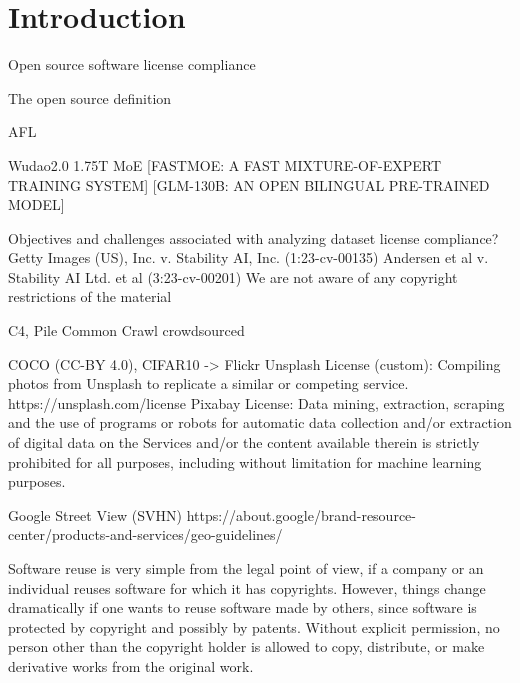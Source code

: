 \section{Introduction}
Open source software license compliance~\cite{ombredanne2020free}

The open source definition~\cite{perens1999open}

AFL~\cite{rosen2005open}

Wudao2.0 1.75T MoE
[FASTMOE: A FAST MIXTURE-OF-EXPERT TRAINING SYSTEM]
[GLM-130B: AN OPEN BILINGUAL PRE-TRAINED MODEL]

Objectives and challenges associated with analyzing dataset license compliance?
Getty Images (US), Inc. v. Stability AI, Inc. (1:23-cv-00135)
Andersen et al v. Stability AI Ltd. et al (3:23-cv-00201)
We are not aware of any copyright restrictions of the material

C4, Pile Common Crawl
crowdsourced

COCO (CC-BY 4.0), CIFAR10 -> Flickr
Unsplash License (custom): Compiling photos from Unsplash to replicate a similar or competing service. https://unsplash.com/license
Pixabay License: Data mining, extraction, scraping and the use of programs or robots for automatic data collection and/or extraction of digital data on the Services and/or the content available therein is strictly prohibited for all purposes, including without limitation for machine learning purposes.

Google Street View (SVHN) https://about.google/brand-resource-center/products-and-services/geo-guidelines/



Software reuse is very simple from the legal point of view, if a company or an
individual reuses software for which it has copyrights. However, things change dramatically
if one wants to reuse software made by others, since software is protected
by copyright and possibly by patents. Without explicit permission, no person other
than the copyright holder is allowed to copy, distribute, or make derivative works
from the original work.